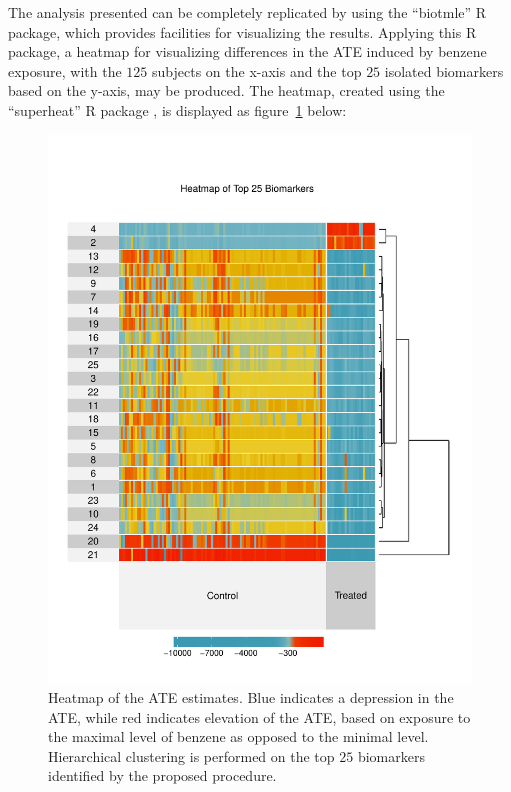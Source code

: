 The analysis presented can be completely replicated by using the ``biotmle'' R
package, which provides facilities for visualizing the results. Applying this
R package, a heatmap for visualizing differences in the ATE induced by benzene
exposure, with the $125$ subjects on the x-axis and the top $25$ isolated
biomarkers based on the y-axis, may be produced. The heatmap, created using the
``superheat'' R package \cite{barter2017superheat}, is displayed as
figure~\ref{fig:heatmap} below:

\begin{figure}[H]
  \vspace{-4em}
  \label{fig:heatmap}
  \centering
  \includegraphics[scale=0.75]{figs/superheatmap.pdf}
  \caption{Heatmap of the ATE estimates. Blue indicates a depression in the
    ATE, while red indicates elevation of the ATE, based on exposure to the
    maximal level of benzene as opposed to the minimal level. Hierarchical
    clustering is performed on the top $25$ biomarkers identified by the
    proposed procedure.}
\end{figure}

